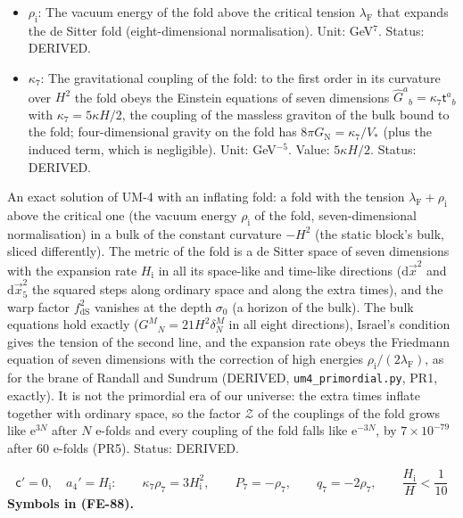 \documentclass[
  10pt,
]{article}
\begin{document}
\begin{itemize}
  \(\rho_\Lambda\). Unit: GeV\(^7\). Value: \(12H/\kappa\);
  \(\lambda_{\mathrm{F}}V_* = 30H^2M_{\mathrm{red}}^2 = 1.1\times10^{45}\)
  GeV\(^4\) for \(H = 2534\) GeV. Status: DERIVED.
\item
  \(\rho_{\mathrm{i}}\): The vacuum energy of the fold above the
  critical tension \(\lambda_{\mathrm{F}}\) that expands the de Sitter
  fold (eight-dimensional normalisation). Unit: GeV\(^7\). Status:
  DERIVED.
\item
  \(\kappa_7\): The gravitational coupling of the fold: to the first
  order in its curvature over \(H^2\) the fold obeys the Einstein
  equations of seven dimensions
  \(\hat G^a{}_b = \kappa_7\mathsf{t}^a{}_b\) with
  \(\kappa_7 = 5\kappa H/2\), the coupling of the massless graviton of
  the bulk bound to the fold; four-dimensional gravity on the fold has
  \(8\pi G_{\mathrm{N}} = \kappa_7/V_*\) (plus the induced term, which
  is negligible). Unit: GeV\(^{-5}\). Value: \(5\kappa H/2\). Status:
  DERIVED.
\end{itemize}

An exact solution of UM-4 with an inflating fold: a fold with the
tension \(\lambda_{\mathrm{F}} + \rho_{\mathrm{i}}\) above the critical
one (the vacuum energy \(\rho_{\mathrm{i}}\) of the fold,
seven-dimensional normalisation) in a bulk of the constant curvature
\(-H^2\) (the static block's bulk, sliced differently). The metric of
the fold is a de Sitter space of seven dimensions with the expansion
rate \(H_{\mathrm{i}}\) in all its space-like and time-like directions
(\(\mathrm{d}\vec x^2\) and \(\mathrm{d}\vec x_5^2\) the squared steps
along ordinary space and along the extra times), and the warp factor
\(f_{\mathrm{dS}}^2\) vanishes at the depth \(\sigma_0\) (a horizon of
the bulk). The bulk equations hold exactly
(\(G^M{}_N = 21H^2\delta^M_N\) in all eight directions), Israel's
condition gives the tension of the second line, and the expansion rate
obeys the Friedmann equation of seven dimensions with the correction of
high energies \(\rho_{\mathrm{i}}/(2\lambda_{\mathrm{F}})\), as for the
brane of Randall and Sundrum (DERIVED, \texttt{um4\_primordial.py}, PR1,
exactly). It is not the primordial era of our universe: the extra times
inflate together with ordinary space, so the factor \(\mathcal{Z}\) of
the couplings of the fold grows like \(\mathrm{e}^{3N}\) after \(N\)
e-folds and every coupling of the fold falls like \(\mathrm{e}^{-3N}\),
by \(7\times10^{-79}\) after 60 e-folds (PR5). Status: DERIVED.

\[
\mathsf{c}' = 0,\quad a_4' = H_{\mathrm{i}}:\qquad \kappa_7\rho_7 = 3H_{\mathrm{i}}^2,\qquad P_7 = -\rho_7,\qquad q_7 = -2\rho_7,\qquad
\frac{H_{\mathrm{i}}}{H} < \frac{1}{10} \tag{FE-88}
\] \textbf{Symbols in (FE-88).}
\end{document}
